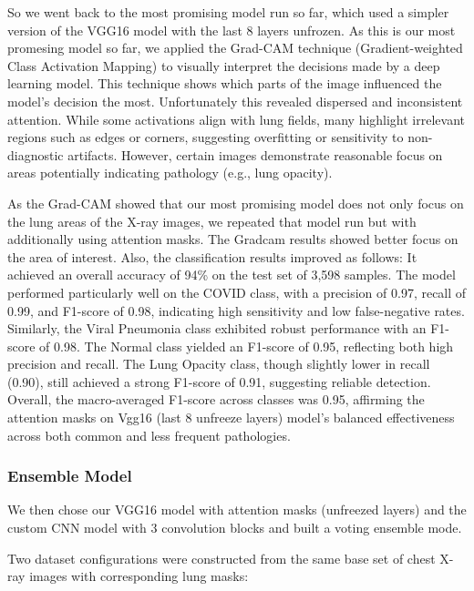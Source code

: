 \documentclass{article}
\begin{document}
So we went back to the most promising model run so far, which used a simpler version of the VGG16 model with the last 8 layers unfrozen. As this is our most promesing model so far, we applied the Grad-CAM technique (Gradient-weighted Class Activation Mapping) to visually interpret the decisions made by a deep learning model. This technique shows which parts of the image influenced the model’s decision the most. Unfortunately this revealed dispersed and inconsistent attention. While some activations align with lung fields, many highlight irrelevant regions such as edges or corners, suggesting overfitting or sensitivity to non-diagnostic artifacts. However, certain images demonstrate reasonable focus on areas potentially indicating pathology (e.g., lung opacity).

As the Grad-CAM showed that our most promising model does not only focus on the lung areas of the X-ray images, we repeated that model run but with additionally using attention masks. The Gradcam results showed better focus on the area of interest. Also, the classification results improved as follows: It achieved an overall accuracy of 94\% on the test set of 3,598 samples. The model performed particularly well on the COVID class, with a precision of 0.97, recall of 0.99, and F1-score of 0.98, indicating high sensitivity and low false-negative rates. Similarly, the Viral Pneumonia class exhibited robust performance with an F1-score of 0.98. The Normal class yielded an F1-score of 0.95, reflecting both high precision and recall. The Lung Opacity class, though slightly lower in recall (0.90), still achieved a strong F1-score of 0.91, suggesting reliable detection. Overall, the macro-averaged F1-score across classes was 0.95, affirming the attention masks on Vgg16 (last 8 unfreeze layers) model’s balanced effectiveness across both common and less frequent pathologies.



\subsubsection {Ensemble Model} \label{section:ensemble_model}
We then chose our VGG16 model with attention masks (unfreezed layers) and the custom CNN model with 3 convolution blocks and built a voting ensemble mode.

Two dataset configurations were constructed from the same base set of chest X-ray images with corresponding lung masks:
\end{document}
